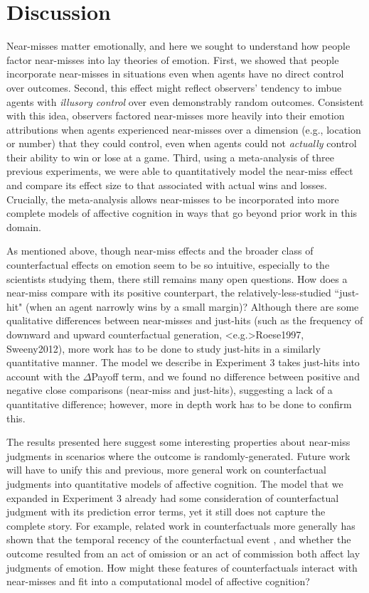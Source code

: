 \documentclass[10pt,letterpaper]{article}
\begin{document}
\section{Discussion}

Near-misses matter emotionally, and here we sought to understand how people factor near-misses into lay theories of emotion. First, we showed that people incorporate near-misses in situations even when agents have no direct control over outcomes. Second, this effect might reflect observers' tendency to imbue agents with \textit{illusory control} over even demonstrably random outcomes.  Consistent with this idea, observers factored near-misses more heavily into their emotion attributions when agents experienced near-misses over a dimension (e.g., location or number) that they could control, even when agents could not \textit{actually} control their ability to win or lose at a game. Third, using a meta-analysis of three previous experiments, we were able to quantitatively model the near-miss effect and compare its effect size to that associated with actual wins and losses. Crucially, the meta-analysis allows near-misses to be incorporated into more complete models of affective cognition in ways that go beyond prior work in this domain.


	As mentioned above, though near-miss effects and the broader class of counterfactual effects on emotion seem to be so intuitive, especially to the scientists studying them, there still remains many open questions. How does a near-miss compare with its positive counterpart, the relatively-less-studied ``just-hit" (when an agent narrowly wins by a small margin)? Although there are some qualitative differences between near-misses and just-hits (such as the frequency of downward and upward counterfactual generation, \citeNP<e.g.>{Roese1997, Sweeny2012}), more work has to be done to study just-hits in a similarly quantitative manner. The model we describe in Experiment 3 takes just-hits into account with the $\Delta$Payoff term, and we found no difference between positive and negative close comparisons (near-miss and just-hits), suggesting a lack of a quantitative difference; however, more in depth work has to be done to confirm this.

	The results presented here suggest some interesting properties about near-miss judgments in scenarios where the outcome is randomly-generated. Future work will have to unify this and previous, more general work on counterfactual judgments into quantitative models of affective cognition. The model that we expanded in Experiment 3 already had some consideration of counterfactual judgment with its prediction error terms, yet it still does not capture the complete story. For example, related work in counterfactuals more generally has shown that the temporal recency of the counterfactual event \cite{Miller1990}, and whether the outcome resulted from an act of omission or an act of commission \cite{Kahneman1982, Landman1987} both affect lay judgments of emotion. How might these features of counterfactuals interact with near-misses and fit into a computational model of affective cognition? 
\end{document}

